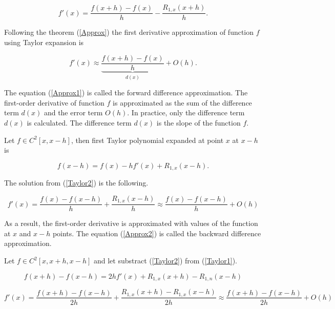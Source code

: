\begin{equation}
 f'(x) = \frac{f(x + h) - f(x)}{h} - \frac{R_{1, x}(x + h)}{h}.
\end{equation}

Following the theorem (\ref{Approx}) the first derivative approximation of function \(f\) using Taylor expansion is

\begin{equation} \label{Approx1}
 f'(x) \approx \underbrace{\frac{f(x + h) - f(x)}{h}}_{d(x)} + O(h).
\end{equation}

The equation (\ref{Approx1}) is called the forward difference approximation.
The first-order derivative of function \(f\) is approximated as the sum of the difference term \(d(x)\) and the error term \(O(h)\).
In practice, only the difference term \(d(x)\) is calculated.
The difference term \(d(x)\) is the slope of the function \(f\).

Let \(f \in C^2[x, x - h]\), then first Taylor polynomial expanded at point \(x\) at \(x - h\) is

\begin{equation} \label{Taylor2}
 f(x - h) = f(x) - h f'(x) + R_{1, x}(x - h).
\end{equation}

The solution from (\ref{Taylor2}) is the following.

\begin{equation} \label{Approx2}
 f'(x) = \frac{f(x) - f(x - h)}{h} + \frac{R_{1, x}(x - h)}{h} \approx \frac{f(x) - f(x - h)}{h} + O(h)
\end{equation}

As a result, the first-order derivative is approximated with values of the function at \(x\) and \(x - h\) points.
The equation (\ref{Approx2}) is called the backward difference approximation.

Let \(f \in C^2[x, x + h, x - h]\) and let substract (\ref{Taylor2}) from (\ref{Taylor1}).

\begin{equation}
 f(x + h) - f(x - h) = 2 h f'(x) + R_{1, x}(x + h) - R_{1, n}(x - h)
\end{equation}

\begin{equation} \label{Approx3.parent}
 f'(x) = \frac{f(x + h) - f(x - h)}{2h} + \frac{R_{1, x}(x + h) - R_{1, x}(x - h)}{2h} \approx \frac{f(x + h) - f(x - h)}{2h} + O(h)
\end{equation}

